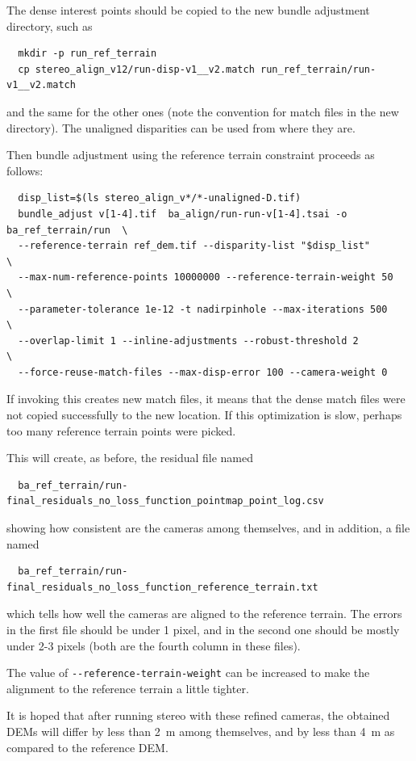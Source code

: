 The dense interest points should be copied to the new bundle adjustment directory, such as
\begin{verbatim}
  mkdir -p run_ref_terrain
  cp stereo_align_v12/run-disp-v1__v2.match run_ref_terrain/run-v1__v2.match
\end{verbatim}

and the same for the other ones (note the convention for match files in the new directory).
The unaligned disparities can be used from where they are. 

Then bundle adjustment using the reference terrain constraint proceeds as follows:
\begin{verbatim}
  disp_list=$(ls stereo_align_v*/*-unaligned-D.tif)
  bundle_adjust v[1-4].tif  ba_align/run-run-v[1-4].tsai -o ba_ref_terrain/run  \
  --reference-terrain ref_dem.tif --disparity-list "$disp_list"                 \
  --max-num-reference-points 10000000 --reference-terrain-weight 50             \ 
  --parameter-tolerance 1e-12 -t nadirpinhole --max-iterations 500              \
  --overlap-limit 1 --inline-adjustments --robust-threshold 2                   \
  --force-reuse-match-files --max-disp-error 100 --camera-weight 0
\end{verbatim}

If invoking this creates new match files, it means that the dense match files 
were not copied successfully to the new location. If this optimization is slow,
perhaps too many reference terrain points were picked. 

This will create, as before, the residual file named
\begin{verbatim}
  ba_ref_terrain/run-final_residuals_no_loss_function_pointmap_point_log.csv
\end{verbatim}
showing how consistent are the cameras among themselves, 
and in addition, a file named
\begin{verbatim}
  ba_ref_terrain/run-final_residuals_no_loss_function_reference_terrain.txt
\end{verbatim}

which tells how well the cameras are aligned to the reference
terrain. The errors in the first file should be under 1 pixel, and in
the second one should be mostly under 2-3 pixels (both are the fourth
column in these files).

The value of \texttt{-\/-reference-terrain-weight} can be increased to make the 
alignment to the reference terrain a little tighter.

It is hoped that after running stereo with these refined cameras, the obtained DEMs
will differ by less than 2~m among themselves, and by less than 4~m as compared
to the reference DEM. 

